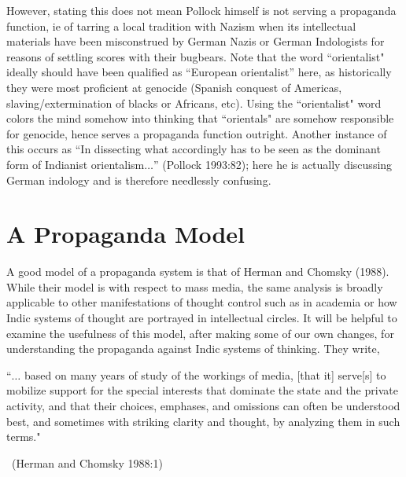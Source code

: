 However, stating this does not mean Pollock himself is not serving a propaganda function, ie of tarring a local tradition with Nazism when its intellectual materials have been misconstrued by German Nazis or German Indologists for reasons of settling scores with their bugbears. Note that the word ``orientalist" ideally should have been qualified as “European orientalist” here, as historically they were most proficient at genocide (Spanish conquest of Americas, slaving/extermination of blacks or Africans, etc). Using the ``orientalist" word colors the mind somehow into thinking that ``orientals" are somehow responsible for genocide, hence serves a propaganda function outright. Another instance of this occurs as “In dissecting what accordingly has to be seen as the dominant form of Indianist orientalism$\ldots$” (Pollock 1993:82); here he is actually discussing German indology and is therefore needlessly confusing.
\smallskip

\section*{A Propaganda Model}

A good model of a propaganda system is that of Herman and Chomsky (1988). While their model is with respect to mass media, the same analysis is broadly applicable to other manifestations of thought control such as in academia or how Indic systems of thought are portrayed in intellectual circles. It will be helpful to examine the usefulness of this model, after making some of our own changes, for understanding the propaganda against Indic systems of thinking. They write, 
\begin{myquote}
``$\ldots$ based on many years of study of the workings of media, [that it] serve[s] to mobilize support for the special interests that dominate the state and the private activity, and that their choices, emphases, and omissions can often be understood best, and sometimes with striking clarity and thought, by analyzing them in such terms."

~\hfill(Herman and Chomsky 1988:1)
\end{myquote}
\smallskip

